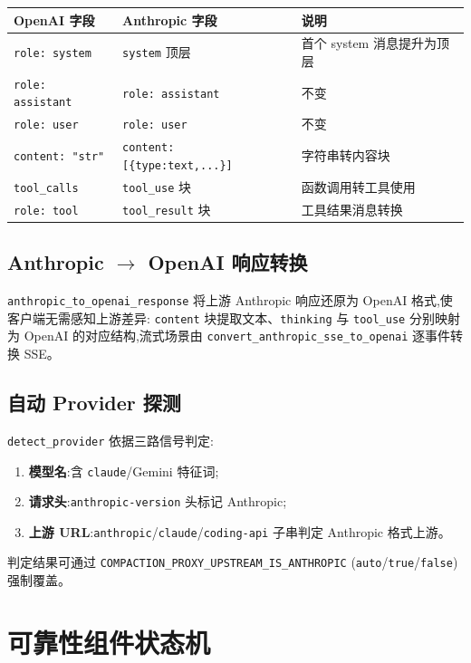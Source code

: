 \documentclass[11pt,a4paper]{article}
\begin{document}
\begin{longtable}{@{}llp{7cm}@{}}
  \toprule
  OpenAI 字段 & Anthropic 字段 & 说明 \\
  \midrule
  \texttt{role: system} & \texttt{system} 顶层 & 首个 system 消息提升为顶层 \\
  \texttt{role: assistant} & \texttt{role: assistant} & 不变 \\
  \texttt{role: user} & \texttt{role: user} & 不变 \\
  \texttt{content: "str"} & \texttt{content: [\{type:text,...\}]} & 字符串转内容块 \\
  \texttt{tool\_calls} & \texttt{tool\_use} 块 & 函数调用转工具使用 \\
  \texttt{role: tool} & \texttt{tool\_result} 块 & 工具结果消息转换 \\
  \bottomrule
\end{longtable}

\subsection{Anthropic $\rightarrow$ OpenAI 响应转换}

\texttt{anthropic\_to\_openai\_response} 将上游 Anthropic 响应还原为
OpenAI 格式,使客户端无需感知上游差异:
\texttt{content} 块提取文本、\texttt{thinking} 与 \texttt{tool\_use}
分别映射为 OpenAI 的对应结构,流式场景由
\texttt{convert\_anthropic\_sse\_to\_openai} 逐事件转换 SSE。

\subsection{自动 Provider 探测}

\texttt{detect\_provider} 依据三路信号判定:
\begin{enumerate}[leftmargin=2em]
  \item \textbf{模型名}:含 \texttt{claude}/Gemini 特征词;
  \item \textbf{请求头}:\texttt{anthropic-version} 头标记 Anthropic;
  \item \textbf{上游 URL}:\texttt{anthropic}/\texttt{claude}/\texttt{coding-api}
        子串判定 Anthropic 格式上游。
\end{enumerate}
判定结果可通过 \texttt{COMPACTION\_PROXY\_UPSTREAM\_IS\_ANTHROPIC}
(\texttt{auto}/\texttt{true}/\texttt{false})强制覆盖。

\section{可靠性组件状态机}
\end{document}

